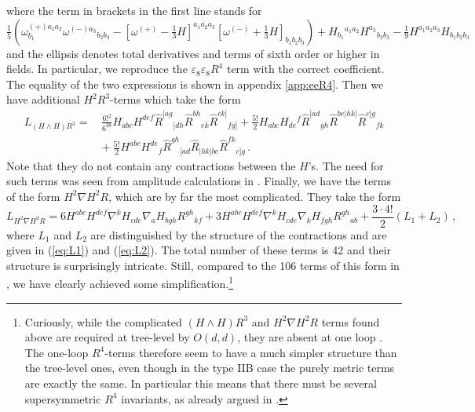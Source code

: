 \documentclass[a4paper,11pt]{article}
\begin{document}
where the term in brackets in the first line stands for
\begin{equation}
\tfrac{1}{5}\left(\omega_{b_1}^{(+)a_1a_2}\omega^{(-)a_3}{}_{b_2b_3}-[\omega^{(+)}-\tfrac13H]^{a_1a_2a_3}[\omega^{(-)}+\tfrac13H]_{b_1b_2b_3}\right)
+H_{b_1}{}^{a_1a_2}H^{a_3}{}_{b_2b_3}-\tfrac{1}{9}H^{a_1a_2a_3}H_{b_1b_2b_3}
\end{equation}
and the ellipsis denotes total derivatives and terms of sixth order or higher in fields. In particular, we reproduce the $\varepsilon_8\varepsilon_8R^4$ term with the correct coefficient.
The equality of the two expressions is shown in appendix \ref{app:eeR4}. Then we have additional $H^2R^3$-terms which take the form
\begin{align}
L_{(H\wedge H)R^3}
=&\,
\frac{6!^2}{6^38}H_{abc}H^{def}\hat R^{[ag}{}_{[dh}\hat R^{bh}{}_{ek}\hat R^{ck]}{}_{fg]}
+\frac{5!}{2}H_{abc}H_{de}{}^f\hat R^{[ad}{}_{gh}\hat R^{be|hk|}\hat R^{c]g}{}_{fk}
\nonumber\\
&{}
+\frac{5!}{2}H^{abc}H^{de}{}_f\hat R^{gh}{}_{[ad}\hat R_{|hk|be}\hat R^{fk}{}_{c]g}\,.
\label{eq:Lprime}
%
%
%
%
\end{align}
Note that they do not contain any contractions between the $H$'s. The need for such terms was seen from amplitude calculations in \cite{Liu:2019ses}. Finally, we have the terms of the form $H^2\nabla H^2R$, which are by far the most complicated. They take the form
\begin{equation}
L_{H^2\nabla H^2R}=
6H^{abc}H^{def}\nabla^kH_{cde}\nabla_aH_{bgh}R^{gh}{}_{kf}
+3H^{abc}H^{def}\nabla^kH_{cde}\nabla_kH_{fgh}R^{gh}{}_{ab}
+\frac{3\cdot4!}{2}(L_1+L_2)\,,
\label{eq:Lbis}
\end{equation}
where $L_1$ and $L_2$ are distinguished by the structure of the contractions and are given in (\ref{eq:L1}) and (\ref{eq:L2}). The total number of these terms is 42 and their structure is surprisingly intricate. Still, compared to the 106 terms of this form in \cite{Garousi:2020gio}, we have clearly achieved some simplification.\footnote{Curiously, while the complicated $(H\wedge H)R^3$ and $H^2\nabla H^2R$ terms found above are required at tree-level by $O(d,d)$, they are absent at one loop \cite{Richards:2008sa}. The one-loop $R^4$-terms therefore seem to have a much simpler structure than the tree-level ones, even though in the type IIB case the purely metric terms are exactly the same. In particular this means that there must be several supersymmetric $R^4$ invariants, as already argued in \cite{Liu:2019ses}.}
 
\end{document}
